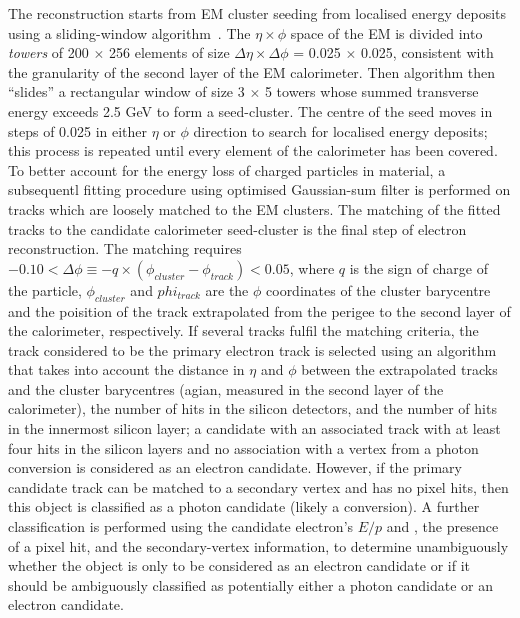 The reconstruction starts from EM cluster seeding from localised energy deposits 
using a sliding-window algorithm~\cite{sliding-window}.
The $\eta \times \phi$ space of the EM is divided into \textit{towers} of 200 $\times$ 256
elements of size $\Delta\eta \times \Delta\phi$ = 0.025 $\times$ 0.025, consistent with the
granularity of the second layer of the EM calorimeter. Then algorithm then ``slides'' a rectangular
window of size 3 $\times$ 5 towers whose summed transverse energy exceeds 2.5 GeV to form a seed-cluster.
The centre of the seed moves in steps of 0.025 in either $\eta$ or $\phi$ direction to search for localised
energy deposits; this process is repeated until every element of the calorimeter has been covered.
To better account for the energy loss of charged particles in material, a subsequentl fitting procedure
using optimised Gaussian-sum filter \cite{ATLAS-CONF-2012-047} is performed on tracks which are loosely 
matched to the EM clusters. The matching of the fitted tracks to the candidate calorimeter seed-cluster
is the final step of electron reconstruction. 
The matching requires $-0.10 < \Delta\phi \equiv -q \times (\phi_{cluster} - \phi_{track}) < 0.05$, 
where $q$ is the sign of charge of the particle, $\phi_{cluster}$ and $phi_{track}$ are the 
$\phi$ coordinates of the cluster barycentre and the poisition of the track extrapolated from the 
perigee to the second layer of the calorimeter, respectively. 
If several tracks fulfil the matching criteria, the track considered to
be the primary electron track is selected using an algorithm that takes into account the distance in $\eta$
and $\phi$ between the extrapolated tracks and the cluster barycentres (agian, measured in the second layer of the
calorimeter), 
the number of hits in the silicon detectors, 
and the number of hits in the innermost silicon layer; 
a candidate with an associated track with at least four hits in the silicon layers and no association
with a vertex from a photon conversion is considered as an electron candidate. 
However, if the primary candidate track can be matched to a secondary vertex and has no pixel hits, 
then this object is classified as a photon candidate (likely a conversion). 
A further classification is performed using the candidate electron’s $E/p$ and \pt, 
the presence of a pixel hit, and the secondary-vertex information, to determine
unambiguously whether the object is only to be considered as an electron candidate or if it should be
ambiguously classified as potentially either a photon candidate or an electron candidate.

